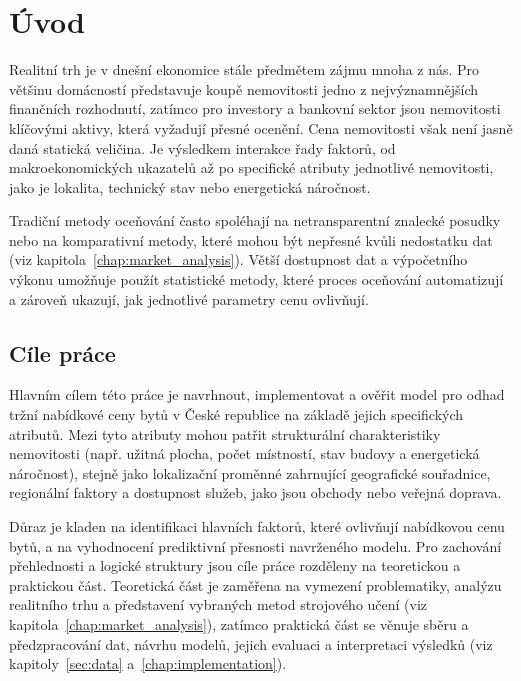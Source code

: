 \chapter{Úvod}
\setcounter{page}{1}



Realitní trh je v dnešní ekonomice stále předmětem zájmu mnoha z nás. Pro většinu domácností představuje koupě nemovitosti jedno z nejvýznamnějších finančních rozhodnutí, zatímco pro investory a bankovní sektor jsou nemovitosti klíčovými aktivy, která vyžadují přesné ocenění. Cena nemovitosti však není jasně daná statická veličina. Je výsledkem interakce řady faktorů, od makroekonomických ukazatelů až po specifické atributy jednotlivé nemovitosti, jako je lokalita, technický stav nebo energetická náročnost.



Tradiční metody oceňování často spoléhají na netransparentní znalecké posudky nebo na komparativní metody, které mohou být nepřesné kvůli nedostatku dat (viz kapitola~\ref{chap:market_analysis}). Větší dostupnost dat a výpočetního výkonu umožňuje použít statistické metody, které proces oceňování automatizují a zároveň ukazují, jak jednotlivé parametry cenu ovlivňují.

\section{Cíle práce}

Hlavním cílem této práce je navrhnout, implementovat a ověřit model pro odhad tržní nabídkové ceny bytů v České republice na základě jejich specifických atributů. Mezi tyto atributy mohou patřit strukturální charakteristiky nemovitosti (např. užitná plocha, počet místností, stav budovy a energetická náročnost), stejně jako lokalizační proměnné zahrnující geografické souřadnice, regionální faktory a dostupnost služeb, jako jsou obchody nebo veřejná doprava. 

Důraz je kladen na identifikaci hlavních faktorů, které ovlivňují nabídkovou cenu bytů, a na vyhodnocení prediktivní přesnosti navrženého modelu. Pro zachování přehlednosti a logické struktury jsou cíle práce rozděleny na teoretickou a praktickou část. Teoretická část je zaměřena na vymezení problematiky, analýzu realitního trhu a představení vybraných metod strojového učení (viz kapitola~\ref{chap:market_analysis}), zatímco praktická část se věnuje sběru a předzpracování dat, návrhu modelů, jejich evaluaci a interpretaci výsledků (viz kapitoly~\ref{sec:data} a~\ref{chap:implementation}).

